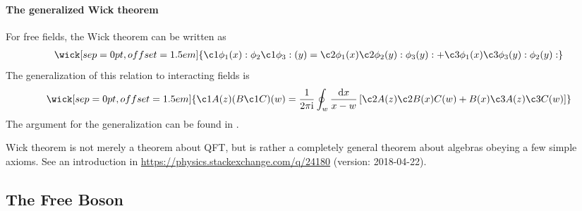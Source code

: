 \documentclass[10pt]{article}
\newcommand{\ii}{\mathrm{i}}
\begin{document}
\paragraph{The generalized Wick theorem}
For free fields, the Wick theorem can be written as 
\begin{align}
    \wick[sep=0pt,offset=1.5em]{\c1 \phi_1(x):\phi_2\c1 \phi_3:(y)=\c2 \phi_1(x)\c2 \phi_2(y):\phi_3(y):+\c3 \phi_1(x)\c3 \phi_3(y):\phi_2(y):}
\end{align}
The generalization of this relation to interacting fields is
\begin{align}
    \wick[sep=0pt,offset=1.5em]{\c1 A(z)(B\c1 C)(w)=\frac{1}{2\pi\ii}\oint_w\frac{\dd{x}}{x-w}\left[\c2 A(z)\c2 B(x)C(w)+B(x)\c3 A(z)\c3 C(w)\right]}
\end{align}
The argument for the generalization can be found in \cite{DiFrancesco:1997nk}. 
\begin{remark}
    Wick theorem is not merely a theorem about QFT, but is rather a completely general theorem about algebras obeying a few simple axioms. 
    See an introduction in \url{https://physics.stackexchange.com/q/24180} (version: 2018-04-22).
\end{remark}

\subsection{The Free Boson}
\end{document}
